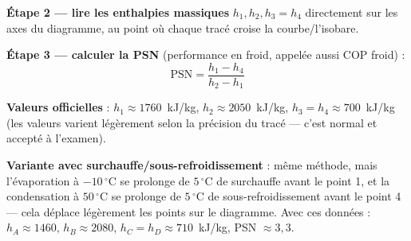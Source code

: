 \documentclass[11pt,a4paper]{article}
\newcommand{\eqb}[1]{\[\boxed{#1}\]}
\begin{document}
\begin{etape}
\textbf{Étape 2 --- lire les enthalpies massiques} $h_1,h_2,h_3=h_4$ directement sur les
axes du diagramme, au point où chaque tracé croise la courbe/l'isobare.
\end{etape}

\begin{etape}
\textbf{Étape 3 --- calculer la PSN} (performance en froid, appelée aussi COP froid) :
\eqb{\text{PSN}=\dfrac{h_1-h_4}{h_2-h_1}}
\end{etape}

\begin{verif}
\textbf{Valeurs officielles}  : $h_1\approx1760$~kJ/kg,
$h_2\approx2050$~kJ/kg, $h_3=h_4\approx700$~kJ/kg (les valeurs varient légèrement
selon la précision du tracé --- c'est normal et accepté à l'examen).
\end{verif}

\begin{info}
\textbf{Variante avec surchauffe/sous-refroidissement}  : même
méthode, mais l'évaporation à $-10\,^\circ$C se prolonge de $5\,^\circ$C de surchauffe
avant le point 1, et la condensation à $50\,^\circ$C se prolonge de $5\,^\circ$C de
sous-refroidissement avant le point 4 --- cela déplace légèrement les points sur le
diagramme. Avec ces données : $h_A\approx1460$, $h_B\approx2080$,
$h_C=h_D\approx710$~kJ/kg, PSN $\approx3{,}3$.
\end{info}
\end{document}
